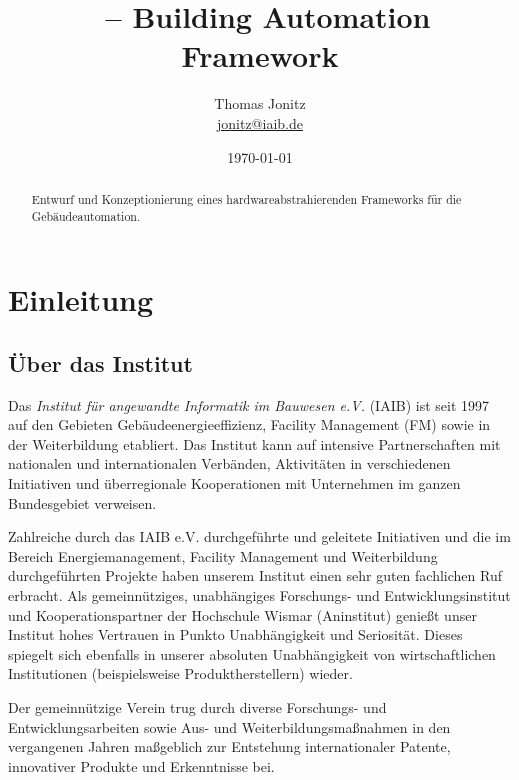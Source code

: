\documentclass{hswpaper}
\title{\NAME\ -- Building Automation Framework}
\author{Thomas Jonitz\\\url{jonitz@iaib.de}}
\date{\today}
\begin{document}
\maketitle
\begin{abstract}
Entwurf und Konzeptionierung eines hardwareabstrahierenden Frameworks für die Gebäudeautomation.
\end{abstract}
\tableofcontents

\section{Einleitung}
\subsection{Über das Institut}
Das \emph{Institut für angewandte Informatik im Bauwesen e.V.} (IAIB) ist seit 1997 auf den Gebieten Gebäudeenergieeffizienz, Facility Management (FM) sowie in der Weiterbildung etabliert. Das Institut kann auf intensive Partnerschaften mit nationalen und internationalen Verbänden, Aktivitäten in verschiedenen Initiativen und überregionale Kooperationen mit Unternehmen im ganzen Bundesgebiet verweisen.\par Zahlreiche durch das IAIB e.V. durchgeführte und geleitete Initiativen und die im Bereich Energiemanagement, Facility Management und Weiterbildung durchgeführten Projekte haben unserem Institut einen sehr guten fachlichen Ruf erbracht. Als gemeinnütziges, unabhängiges Forschungs- und Entwicklungsinstitut und Kooperationspartner der Hochschule Wismar (Aninstitut) genießt unser Institut hohes Vertrauen in Punkto Unabhängigkeit und Seriosität. Dieses spiegelt sich ebenfalls in unserer absoluten Unabhängigkeit von wirtschaftlichen Institutionen (beispielsweise Produktherstellern) wieder.\par Der gemeinnützige Verein trug durch diverse Forschungs- und Entwicklungsarbeiten sowie Aus- und Weiterbildungsmaßnahmen in den vergangenen Jahren maßgeblich zur Entstehung internationaler Patente, innovativer Produkte und Erkenntnisse bei.
\end{document}
